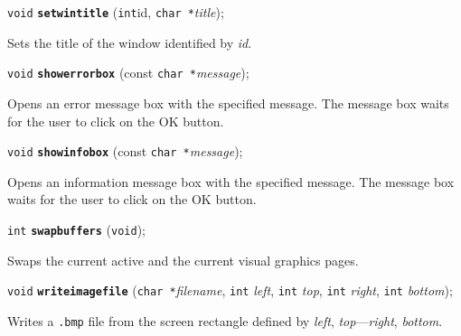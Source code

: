 \documentclass[a4paper,12pt]{article}
\newcommand{\V}{\texttt{void}}      %
\newcommand{\I}{\texttt{int}}       %
\newcommand{\C}{\texttt{char *}}    %
\newcommand{\func}[1]{\textbf{\texttt{#1}}}  %
\newcommand{\A}[1]{\emph{#1}}       %
\newcommand{\F}[1]{\texttt{#1}}     %
\newenvironment{bgi}
{ %
  \begin{snugshade}
}
{ %
  \end{snugshade}
}
\begin{document}

\label{sec:setwintitle}

\begin{bgi}
\V{} \func{setwintitle} (\I{id}, \C{}\A{title});
\end{bgi}

Sets the title of the window identified by \A{id}.


\label{sec:showerrorbox}

\begin{bgi}
\V{} \func{showerrorbox} (const \C{}\A{message});
\end{bgi}

Opens an error message box with the specified message. The message box
waits for the user to click on the OK button.


\label{sec:showinfobox}

\begin{bgi}
\V{} \func{showinfobox} (const \C{}\A{message});
\end{bgi}

Opens an information message box with the specified message. The
message box waits for the user to click on the OK button.


\label{sec:swapbuffers}

\begin{bgi}
\I{} \func{swapbuffers} (\V{});
\end{bgi}

Swaps the current active and the current visual graphics pages.


\label{sec:writeimagefile}

\begin{bgi}
\V{} \func{writeimagefile} (\C{}\A{filename}, \I{} \A{left}, \I{}
\A{top}, \I{} \A{right}, \I{} \A{bottom});
\end{bgi}

Writes a \F{.bmp} file from the screen rectangle defined by
\A{left}, \A{top}---\A{right}, \A{bottom}.
\end{document}

